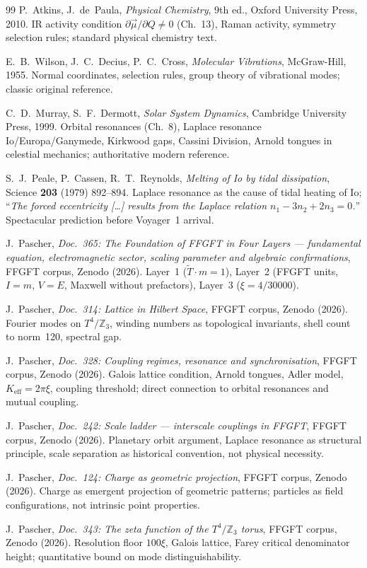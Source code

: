 \begin{thebibliography}{99}
P.~Atkins, J.~de~Paula,
\textit{Physical Chemistry},
9th ed., Oxford University Press, 2010.
IR activity condition $\partial\vec{\mu}/\partial Q\neq0$ (Ch.~13),
Raman activity, symmetry selection rules; standard physical chemistry text.

E.~B.~Wilson, J.~C.~Decius, P.~C.~Cross,
\textit{Molecular Vibrations},
McGraw-Hill, 1955.
Normal coordinates, selection rules, group theory of vibrational modes;
classic original reference.


C.~D.~Murray, S.~F.~Dermott,
\textit{Solar System Dynamics},
Cambridge University Press, 1999.
Orbital resonances (Ch.~8), Laplace resonance Io/Europa/Ganymede,
Kirkwood gaps, Cassini Division, Arnold tongues in celestial mechanics;
authoritative modern reference.

S.~J.~Peale, P.~Cassen, R.~T.~Reynolds,
\textit{Melting of Io by tidal dissipation},
Science \textbf{203} (1979) 892--894.
Laplace resonance as the cause of tidal heating of Io;
``\textit{The forced eccentricity [\ldots] results from the Laplace relation
$n_1 - 3n_2 + 2n_3 = 0$.}'' Spectacular prediction before Voyager~1 arrival.


J.~Pascher,
\textit{Doc.~365: The Foundation of FFGFT in Four Layers ---
fundamental equation, electromagnetic sector, scaling parameter and
algebraic confirmations},
FFGFT corpus, Zenodo (2026).
Layer~1 ($\tilde{T}\cdot m=1$), Layer~2 (FFGFT units, $I=m$, $V=E$,
Maxwell without prefactors), Layer~3 ($\xi=4/30000$).

J.~Pascher,
\textit{Doc.~314: Lattice in Hilbert Space},
FFGFT corpus, Zenodo (2026).
Fourier modes on $T^4/\mathbb{Z}_3$, winding numbers as topological
invariants, shell count to norm~120, spectral gap.

J.~Pascher,
\textit{Doc.~328: Coupling regimes, resonance and synchronisation},
FFGFT corpus, Zenodo (2026).
Galois lattice condition, Arnold tongues, Adler model, $K_\mathrm{eff}=2\pi\xi$,
coupling threshold; direct connection to orbital resonances and mutual coupling.

J.~Pascher,
\textit{Doc.~242: Scale ladder --- interscale couplings in FFGFT},
FFGFT corpus, Zenodo (2026).
Planetary orbit argument, Laplace resonance as structural principle,
scale separation as historical convention, not physical necessity.

J.~Pascher,
\textit{Doc.~124: Charge as geometric projection},
FFGFT corpus, Zenodo (2026).
Charge as emergent projection of geometric patterns; particles as field
configurations, not intrinsic point properties.

J.~Pascher,
\textit{Doc.~343: The zeta function of the $T^4/\mathbb{Z}_3$ torus},
FFGFT corpus, Zenodo (2026).
Resolution floor $100\xi$, Galois lattice, Farey critical denominator
height; quantitative bound on mode distinguishability.

\end{thebibliography}
